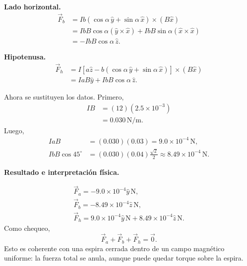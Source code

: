 \documentclass[11pt]{article}
\begin{document}
\textbf{Lado horizontal.}
\begin{align*}
    \vec F_b
    &=Ib(\cos\alpha\,\hat y+\sin\alpha\,\hat x)\times(B\hat x)\\
    &=IbB\cos\alpha(\hat y\times\hat x)+IbB\sin\alpha(\hat x\times\hat x)\\
    &=-IbB\cos\alpha\,\hat z.
\end{align*}

\textbf{Hipotenusa.}
\begin{align*}
    \vec F_h
    &=I\left[a\hat z-b(\cos\alpha\,\hat y+\sin\alpha\,\hat x)\right]\times(B\hat x)\\
    &=IaB\hat y+IbB\cos\alpha\,\hat z.
\end{align*}

Ahora se sustituyen los datos. Primero,
\begin{align*}
    IB&=(12)(2.5\times10^{-3})\\
      &=0.030\,\mathrm{N/m}.
\end{align*}
Luego,
\begin{align*}
    IaB&=(0.030)(0.03)=9.0\times10^{-4}\,\mathrm N,\\
    IbB\cos45^\circ&=(0.030)(0.04)\frac{\sqrt2}{2}
    \approx8.49\times10^{-4}\,\mathrm N.
\end{align*}

\par\medskip\noindent\textbf{Resultado e interpretación física.}\par\smallskip
\begin{align*}
    \boxed{\vec F_a=-9.0\times10^{-4}\hat y\,\mathrm N},\\
    \boxed{\vec F_b=-8.49\times10^{-4}\hat z\,\mathrm N},\\
    \boxed{\vec F_h=9.0\times10^{-4}\hat y\,\mathrm N+8.49\times10^{-4}\hat z\,\mathrm N}.
\end{align*}
Como chequeo,
\begin{equation*}
    \vec F_a+\vec F_b+\vec F_h=\vec0.
\end{equation*}
Esto es coherente con una espira cerrada dentro de un campo magn\'etico uniforme: la fuerza total se anula, aunque puede quedar torque sobre la espira.
\end{document}

